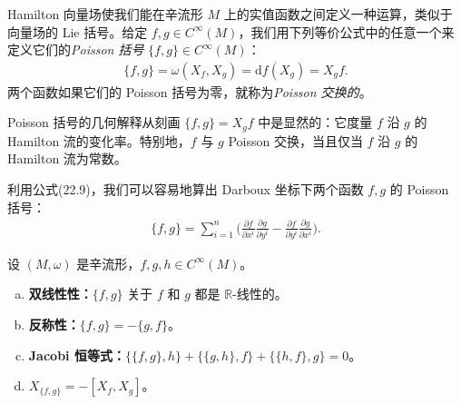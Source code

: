 \documentclass[../../main.tex]{subfiles}
\begin{document}
Hamilton 向量场使我们能在辛流形 $M$ 上的实值函数之间定义一种运算，类似于向量场的 Lie 括号。给定 $f,g\in C^\infty(M)$，我们用下列等价公式中的任意一个来定义它们的\emph{Poisson 括号} $\{f,g\}\in C^\infty(M)$：
\begin{align}
\{f,g\}=\omega(X_f,X_g)=\mathrm{d}f(X_g)=X_g f.
\end{align}
两个函数如果它们的 Poisson 括号为零，就称为\emph{Poisson 交换的}。

Poisson 括号的几何解释从刻画 $\{f,g\}=X_g f$ 中是显然的：它度量 $f$ 沿 $g$ 的 Hamilton 流的变化率。特别地，$f$ 与 $g$ Poisson 交换，当且仅当 $f$ 沿 $g$ 的 Hamilton 流为常数。

利用公式(22.9)，我们可以容易地算出 Darboux 坐标下两个函数 $f,g$ 的 Poisson 括号：
\begin{align}
\{f,g\}=\sum_{i=1}^n\big(\tfrac{\partial f}{\partial x^i}\tfrac{\partial g}{\partial y^i}
-\tfrac{\partial f}{\partial y^i}\tfrac{\partial g}{\partial x^i}\big).
\end{align}

\begin{proposition}\label{proposition:ch22-poisson-properties}
设 $(M,\omega)$ 是辛流形，$f,g,h\in C^\infty(M)$。
\begin{enumerate}[(a)]
\item \textbf{双线性性：}$\{f,g\}$ 关于 $f$ 和 $g$ 都是 $\mathbb R$-线性的。
\item \textbf{反称性：}$\{f,g\}=-\{g,f\}$。
\item \textbf{Jacobi 恒等式：}$\{\{f,g\},h\}+\{\{g,h\},f\}+\{\{h,f\},g\}=0$。
\item $X_{\{f,g\}}=-[X_f,X_g]$。
\end{enumerate}
\end{proposition}
\end{document}
